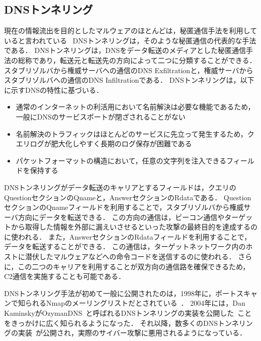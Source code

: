 \subsection{DNSトンネリング}
\label{sec:dns-tunneling}
現在の情報流出を目的としたマルウェアのほとんどは，秘匿通信手法を利用していると言われている~\cite{asaf}
DNSトンネリングは，そのような秘匿通信の代表的な手法である．
DNSトンネリングは，DNSをデータ転送のメディアとした秘匿通信手法の総称であり，転送元と転送先の方向によって二つに分類することができる．
スタブリゾルバから権威サーバへの通信のDNS Exfiltrationと，権威サーバからスタブリゾルバへの通信のDNS Infiltrationである．
DNSトンネリングは，以下に示すDNSの特性に基づいる．

\begin{itemize}
 \setlength{\itemsep}{0pt}
 \item 通常のインターネットの利活用において名前解決は必要な機能であるため，一般にDNSのサービスポートが閉ざされることがない
 \item 名前解決のトラフィックはほとんどのサービスに先立って発生するため，クエリログが肥大化しやすく長期のログ保存が困難である
 \item パケットフォーマットの構造において，任意の文字列を注入できるフィールドを保持する
\end{itemize}

DNSトンネリングがデータ転送のキャリアとするフィールドは，クエリのQuestionセクションのQnameと，AnswerセクションのRdataである．
QuestionセクションのQnameフィールドを利用することで，スタブリゾルバから権威サーバ方向にデータを転送できる．
この方向の通信は，ビーコン通信やターゲットから取得した情報を外部に漏えいさせるといった攻撃の最終目的を達成するのに使われる．
また，AnswerセクションのRdataフィールドを利用することで，データを転送することができる．
この通信は，ターゲットネットワーク内のホストに潜伏したマルウェアなどへの命令コードを送信するのに使われる．
さらに，この二つのキャリアを利用することが双方向の通信路を確保できるため，C2通信を実施することも可能である．

DNSトンネリング手法が初めて一般に公開されたのは，1998年に，ポートスキャンで知られるNmapのメーリングリストだとされている~\cite{nmap, maarten}．
2004年には，Dan KaminskyがOzymanDNS~\cite{ozymandns}と呼ばれるDNSトンネリングの実装を公開した~\cite{dan-kaminsky}ことをきっかけに広く知られるようになった．
それ以降，数多くのDNSトンネリングの実装~\cite{heyoka, iodine, dnscat2, tcp-over-dns, dnscat, denise, dns-shell, dnsbotnet, dnscapy, dohtunnel, godoh, dohc2, magictunnelandroid, dns2tcp, tuns}が公開され，実際のサイバー攻撃に悪用されるようになっている．


